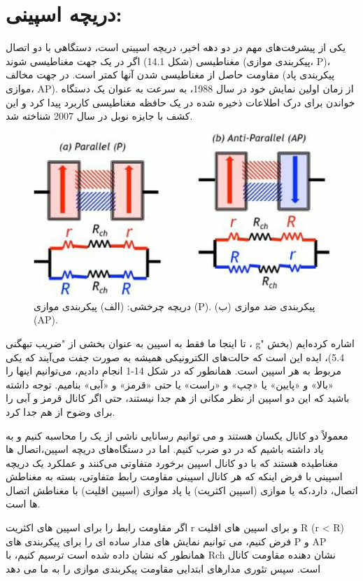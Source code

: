 \section{دریچه اسپینی:}
یکی از پیشرفت‌های مهم در دو دهه اخیر، دریچه اسپینی  است، دستگاهی با دو اتصال مغناطیسی (شکل 14.1) اگر در یک جهت مغناطیسی شوند (پیکربندی موازی، P)، مقاومت حاصل از مغناطیسی شدن آنها کمتر است. در جهت مخالف (پیکربندی پاد موازی، AP). از زمان اولین نمایش خود در سال 1988، به سرعت به عنوان یک دستگاه خواندن برای درک اطلاعات ذخیره شده در یک حافظه مغناطیسی کاربرد پیدا کرد و این کشف با جایزه نوبل در سال 2007 شناخته شد.
\begin{figure}[!ht]
  \includegraphics[width=0.5\linewidth]{./figures/spinvalve.png}
  \caption{دریچه چرخشی: (الف) پیکربندی موازی (P). (ب) پیکربندی ضد موازی (AP).}
\end{figure}
تا اینجا ما فقط به اسپین به عنوان بخشی از "ضریب تبهگنی ، g" اشاره کرده‌ایم (بخش 5.4)، ایده این است که حالت‌های الکترونیکی همیشه به صورت جفت می‌آیند که یکی مربوط به هر اسپین است. همانطور که در شکل 14-1 انجام دادیم، می‌توانیم اینها را «بالا» و «پایین» یا «چپ» و «راست» یا حتی «قرمز» و «آبی» بنامیم. توجه داشته باشید که این دو اسپین از نظر مکانی از هم جدا نیستند، حتی اگر کانال قرمز و آبی را برای وضوح از هم جدا کرد.

معمولاً دو کانال یکسان هستند و می توانیم رسانایی ناشی از یک را محاسبه کنیم و به یاد داشته باشیم که در دو ضرب کنیم. اما در دستگاه‌های دریچه اسپین،اتصال ها مغناطیده هستند که با دو کانال اسپین برخورد متفاوتی می‌کنند و عملکرد یک دریچه اسپینی با فرض اینکه که هر کانال اسپینی مقاومت رابط  متفاوتی، بسته به مغناطش اتصال، دارد،که یا موازی (اسپین اکثریت) یا پاد موازی (اسپین اقلیت) با مغناطش اتصال ها است.

اگر مقاومت رابط را برای اسپین های اکثریت r و برای اسپین های اقلیت R (r < R) فرض کنیم، می توانیم نمایش های مدار ساده ای را برای پیکربندی های P و AP همانطور که نشان داده شده است ترسیم کنیم، با Rch نشان دهنده مقاومت کانال است. سپس تئوری مدارهای ابتدایی مقاومت پیکربندی موازی را به ما می دهد

